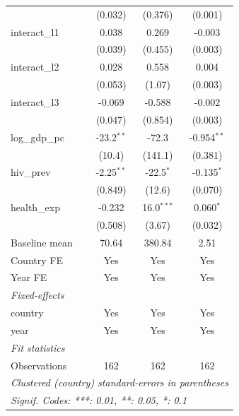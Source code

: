 \begin{table}[htbp]
\begin{tabular}{lccc}
                           & (0.032)        & (0.376)              & (0.001)\\   
      interact\_l1         & 0.038          & 0.269                & -0.003\\   
                           & (0.039)        & (0.455)              & (0.003)\\   
      interact\_l2         & 0.028          & 0.558                & 0.004\\   
                           & (0.053)        & (1.07)               & (0.003)\\   
      interact\_l3         & -0.069         & -0.588               & -0.002\\   
                           & (0.047)        & (0.854)              & (0.003)\\   
      log\_gdp\_pc         & -23.2$^{**}$   & -72.3                & -0.954$^{**}$\\   
                           & (10.4)         & (141.1)              & (0.381)\\   
      hiv\_prev            & -2.25$^{**}$   & -22.5$^{*}$          & -0.135$^{*}$\\   
                           & (0.849)        & (12.6)               & (0.070)\\   
      health\_exp          & -0.232         & 16.0$^{***}$         & 0.060$^{*}$\\   
                           & (0.508)        & (3.67)               & (0.032)\\   
      Baseline mean        & 70.64          & 380.84               & 2.51\\  
      Country FE           & Yes            & Yes                  & Yes\\  
      Year FE              & Yes            & Yes                  & Yes\\  
      \midrule
      \emph{Fixed-effects}\\
      country              & Yes            & Yes                  & Yes\\  
      year                 & Yes            & Yes                  & Yes\\  
      \midrule
      \emph{Fit statistics}\\
      Observations         & 162            & 162                  & 162\\  
      \midrule \midrule
      \multicolumn{4}{l}{\emph{Clustered (country) standard-errors in parentheses}}\\
      \multicolumn{4}{l}{\emph{Signif. Codes: ***: 0.01, **: 0.05, *: 0.1}}\\
   \end{tabular}
\end{table}
